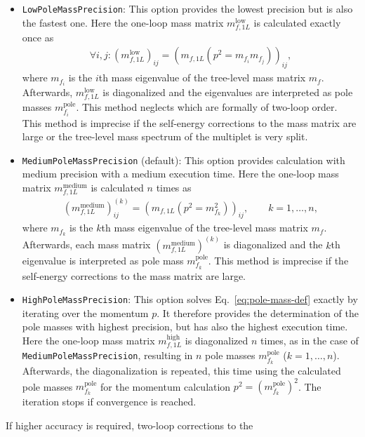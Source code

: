 \documentclass[final,3p,11pt,pdflatex]{elsarticle}
\newcommand{\code}[1]{\lstinline|#1|}  %
\newcommand{\pole}{\text{pole}}
\begin{document}
\begin{itemize}
\item \code{LowPoleMassPrecision}: This option provides the
  lowest precision but is also the fastest one.  Here the one-loop
  mass matrix $m_{f,1L}^\text{low}$ is calculated exactly once as
%
  \begin{align}
    \forall i,j: (m_{f,1L}^\text{low})_{ij} = (m_{f,1L}(p^2 = m_{f_i}
    m_{f_j}))_{ij} ,
  \end{align}
%
  where $m_{f_i}$ is the $i$th mass eigenvalue of the tree-level mass
  matrix $m_f$.  Afterwards, $m_{f,1L}^\text{low}$ is diagonalized and
  the eigenvalues are interpreted as pole masses $m_{f_i}^\pole$.
  This method neglects which are formally of two-loop order.  This
  method is imprecise if the self-energy corrections to the mass
  matrix are large or the tree-level mass spectrum of the multiplet is
  very split.

\item \code{MediumPoleMassPrecision} (default): This option
  provides calculation with medium precision with a medium execution
  time.  Here the one-loop mass matrix $m_{f,1L}^\text{medium}$ is
  calculated $n$ times as
%
  \begin{align}
    (m_{f,1L}^\text{medium})_{ij}^{(k)} = (m_{f,1L}(p^2 =
    m_{f_k}^2))_{ij} , \qquad k = 1,\ldots,n ,
  \end{align}
%
  where $m_{f_k}$ is the $k$th mass eigenvalue of the tree-level mass
  matrix $m_f$.  Afterwards, each mass matrix
  $(m_{f,1L}^\text{medium})^{(k)}$ is diagonalized and the $k$th
  eigenvalue is interpreted as pole mass $m_{f_k}^\pole$.  This method
  is imprecise if the self-energy corrections to the mass matrix are
  large.

\item \code{HighPoleMassPrecision}: This option solves
  Eq.~\eqref{eq:pole-mass-def} exactly by iterating over the momentum
  $p$.  It therefore provides the determination of the pole masses
  with highest precision, but has also the highest execution time.
  Here the one-loop mass matrix $m_{f,1L}^\text{high}$ is diagonalized
  $n$ times, as in the case of \code{MediumPoleMassPrecision},
  resulting in $n$ pole masses $m_{f_k}^\pole$ ($k = 1,\ldots,n$).
  Afterwards, the diagonalization is repeated, this time using the
  calculated pole masses $m_{f_k}^\pole$ for the momentum calculation
  $p^2 = (m_{f_k}^\pole)^2$.  The iteration stops if convergence is
  reached.
\end{itemize}
%
If higher accuracy is required, two-loop corrections to the
\end{document}

